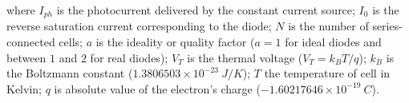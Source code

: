 \noindent where $I_{ph}$ is the photocurrent delivered by the constant current source; $I_{0}$ is the reverse saturation current corresponding to the diode; $N$ is the number of series-connected cells; %
$a$ is the ideality or quality factor ($a=1$ for ideal diodes and between $1$ and $2$ for real diodes); $V_{T}$ is the thermal voltage ($ V_{T}=k_{B}T/q $); $ k_{B} $ is the Boltzmann constant ($ 1.3806503\times10^{-23}\:J/K $); $T$ the temperature of cell in Kelvin; $q$ is absolute value of the electron's charge ($ -1.60217646\times10^{-19}\:C $).

%
